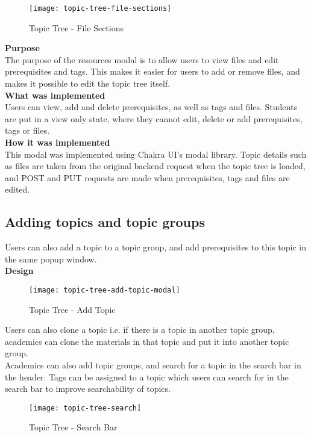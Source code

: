 \begin{figure}[h!]
    \centering
    \texttt{[image: topic-tree-file-sections]}
    \caption{Topic Tree - File Sections}
\end{figure}

\textbf{Purpose} \\
The purpose of the resources modal is to allow users to view files and edit prerequisites and tags. This makes it easier for users to add or remove files, and makes it possible to edit the topic tree itself.\\

\textbf{What was implemented} \\
Users can view, add and delete prerequisites, as well as tags and files. Students are put in a view only state, where they cannot edit, delete or add prerequisites, tags or files.\\

\textbf{How it was implemented} \\
This modal was implemented using Chakra UI's modal library. Topic details such as files are taken from the original backend request when the topic tree is loaded, and POST and PUT requests are made when prerequisites, tags and files are edited.

\subsection{Adding topics and topic groups}
Users can also add a topic to a topic group, and add prerequisites to this topic in the same popup window. \\

\textbf{Design} \\

\begin{figure}[h!]
    \centering
    \texttt{[image: topic-tree-add-topic-modal]}
    \caption{Topic Tree - Add Topic}
\end{figure}

Users can also clone a topic i.e. if there is a topic in another topic group, academics can clone the materials in that topic and put it into another topic group. \\

Academics can also add topic groups, and search for a topic in the search bar in the header. Tags can be assigned to a topic which users can search for in the search bar to improve searchability of topics.

\begin{figure}[h!]
    \centering
    \texttt{[image: topic-tree-search]}
    \caption{Topic Tree - Search Bar}
\end{figure}

